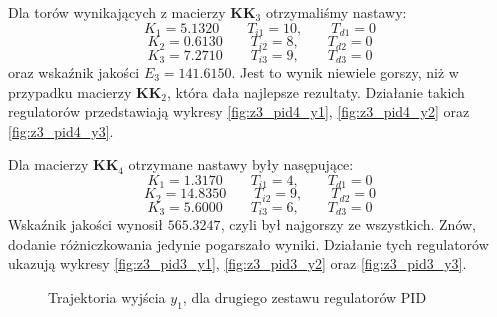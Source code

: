 Dla torów wynikających z macierzy $\bm{KK}_3$ otrzymaliśmy nastawy:
\begin{equation}
  K_1 = \num{5.1320} \qquad T_{i1} = 10, \qquad T_{d1} = 0 \nonumber
\end{equation}
\begin{equation}
  K_2 = \num{0.6130} \qquad T_{i2} = 8, \qquad T_{d2} = 0
\end{equation}
\begin{equation}
  K_3 = \num{7.2710} \qquad T_{i3} = 9, \qquad T_{d3} = 0 \nonumber
\end{equation}
oraz wskaźnik jakości $E_3 = \num{141.6150}$. Jest to wynik niewiele gorszy, niż
w przypadku macierzy $\bm{KK}_2$, która dała najlepsze rezultaty.
Działanie takich regulatorów przedstawiają wykresy \ref{fig:z3_pid4_y1},
\ref{fig:z3_pid4_y2} oraz \ref{fig:z3_pid4_y3}.

Dla macierzy $\bm{KK}_4$ otrzymane nastawy
były nasępujące:
\begin{equation}
  K_1 = \num{1.3170} \qquad T_{i1} = 4, \qquad T_{d1} = 0 \nonumber
\end{equation}
\begin{equation}
  K_2 = \num{14.8350} \qquad T_{i2} = 9, \qquad T_{d2} = 0
\end{equation}
\begin{equation}
  K_3 = \num{5.6000} \qquad T_{i3} = 6, \qquad T_{d3} = 0 \nonumber
\end{equation}
Wskaźnik jakości wynosił $\num{565.3247}$, czyli był najgorszy ze wszystkich.
Znów, dodanie różniczkowania jedynie pogarszało wyniki. Działanie tych
regulatorów ukazują wykresy \ref{fig:z3_pid3_y1},
\ref{fig:z3_pid3_y2} oraz \ref{fig:z3_pid3_y3}.

\begin{figure}[b]
\centering
{}
\caption{Trajektoria wyjścia $y_1$, dla drugiego zestawu regulatorów PID}
\label{fig:z3_pid2_y1}
\end{figure}

